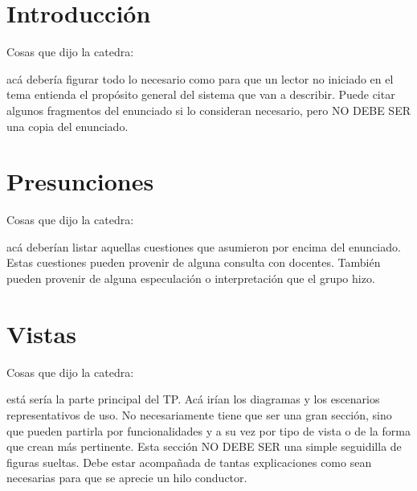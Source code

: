 \documentclass[a4paper,10pt]{article}
\begin{document}
\tableofcontents

\newpage


\section*{Introducci\'on}

Cosas que dijo la catedra:

acá debería figurar todo lo necesario como para que un
lector no iniciado en el tema entienda el propósito general del
sistema que van a describir. Puede citar algunos fragmentos del
enunciado si lo consideran necesario, pero NO DEBE SER una copia del
enunciado.

\section*{Presunciones}

Cosas que dijo la catedra:

acá deberían listar aquellas cuestiones que asumieron
por encima del enunciado. Estas cuestiones pueden provenir de alguna
consulta con docentes. También pueden provenir de alguna especulación
o interpretación que el grupo hizo.


\section*{Vistas}

Cosas que dijo la catedra:

está sería la parte principal del TP. Acá irían los
diagramas y los escenarios representativos de uso. No necesariamente
tiene que ser una gran sección, sino que pueden partirla por
funcionalidades y a su vez por tipo de vista o de la forma que crean
más pertinente. Esta sección NO DEBE SER una simple seguidilla de
figuras sueltas. Debe estar acompañada de tantas explicaciones como
sean necesarias para que se aprecie un hilo conductor.
\end{document}
